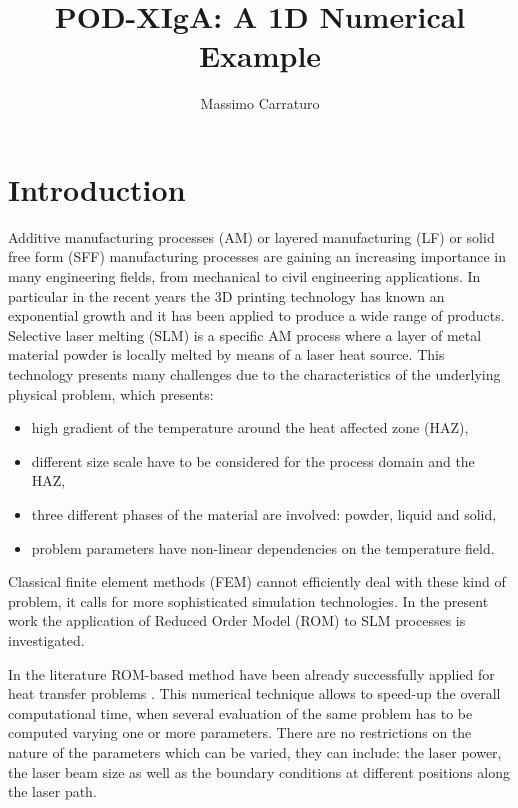 \documentclass[3p]{article}
\begin{document}
\title { POD-XIgA: A 1D Numerical Example}
\author{Massimo Carraturo}

\maketitle


\section*{Introduction}
Additive manufacturing processes (AM) or layered manufacturing (LF) or solid free form (SFF) manufacturing processes are gaining an increasing importance in many engineering fields, from mechanical to civil engineering applications. In particular in the recent years the 3D printing technology has known an exponential growth and it has been applied to produce a wide range of products. Selective laser melting (SLM) is a specific AM process where a layer of metal material powder is locally melted by means of a laser heat source. This technology presents many challenges due to the characteristics of the underlying physical problem, which presents:
\begin{itemize}
\item  high gradient of the temperature around the heat affected zone (HAZ),
\item  different size scale have to be considered for the process domain and the HAZ,
\item  three different phases of the material are involved: powder, liquid and solid,
\item  problem parameters have non-linear dependencies on the temperature field. 
\end{itemize}
Classical finite element methods (FEM) cannot efficiently deal with these kind of problem, it calls for more sophisticated simulation technologies. In the present work the application of Reduced Order Model (ROM) \cite{Rozza2009, Hesthaven_2016} to SLM processes is investigated. \par In the literature ROM-based method have been already successfully applied for heat transfer problems \cite{brands_2016, Rozza2_2009}. This numerical technique allows to speed-up the overall computational time, when several evaluation of the same problem has to be computed varying one or more parameters. There are no restrictions on the nature of the parameters which can be varied, they can include: the laser power, the laser beam size as well as the boundary conditions at different positions along the laser path.
\end{document}
